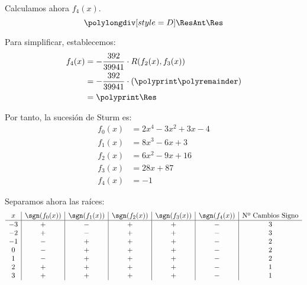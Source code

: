 \begin{ejercicio}
    Calculamos ahora $f_4(x)$.
    \begin{equation*}
        \polylongdiv[style=D]\ResAnt\Res
    \end{equation*}
    \polydiv\div\ResAnt\Res
    \polymul\ResAnt{}
    \polymul\Res{}

    Para simplificar, establecemos:
    \begin{align*}
        f_4(x) &= -\dfrac{392}{39941}\cdot R(f_2(x), f_3(x))\\
        &= -\dfrac{392}{39941}\cdot \left(\polyprint\polyremainder\right)\\
        &= \polyprint\Res
    \end{align*}

    Por tanto, la sucesión de Sturm es:
    \begin{align*}
        f_0(x) &= 2x^4 - 3x^2 + 3x - 4\\
        f_1(x) &= 8x^3 - 6x + 3\\
        f_2(x) &= 6x^2-9x+16\\
        f_3(x) &= 28x+87\\
        f_4(x) &= -1
    \end{align*}

    Separamos ahora las raíces:
        \begin{equation*}
            \begin{array}{c|c|c|c|c|c|c}
                x & \sgn(f_0(x)) & \sgn(f_1(x)) & \sgn(f_2(x)) & \sgn(f_3(x)) & \sgn(f_4(x)) & \text{Nº Cambios Signo}\\ \hline
                -3& + & - & + & + & - & 3\\
                -2& + & - & + & + & - & 3\\
                -1& - & + & + & + & - & 2\\
                0 & - & + & + & + & - & 2\\
                1 & - & + & + & + & - & 2\\
                2 & + & + & + & + & - & 1\\
                3 & + & + & + & + & - & 1
            \end{array}
        \end{equation*}


\end{ejercicio}
